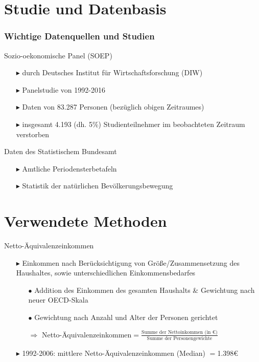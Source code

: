 \documentclass{beamer}
\begin{document}
\section{Studie und Datenbasis}
\begin{frame}
\frametitle{Wichtige Datenquellen und Studien}
  \begin{block}{Sozio-oekonomische Panel (SOEP)}
   \begin{itemize}
     \item [$\blacktriangleright$] durch Deutsches Institut für   Wirtschaftsforschung (DIW)
     \item [$\blacktriangleright$] Panelstudie von 1992-2016
     \item [$\blacktriangleright$] Daten von  83.287 Personen (bezüglich obigen Zeitraumes)
     \item[$\blacktriangleright$] insgesamt 4.193 (dh. 5\%) Studienteilnehmer im beobachteten Zeitraum verstorben
   \end{itemize}
  \end{block}
  \begin{block}{Daten des Statistischem Bundesamt}
   \begin{itemize}
     \item [$\blacktriangleright$] Amtliche Periodensterbetafeln
     \item [$\blacktriangleright$] Statistik der natürlichen Bevölkerungsbewegung
   \end{itemize}
  \end{block}
\end{frame}


\section{Verwendete Methoden}
\begin{frame}{Netto-Äquivalenzeinkommen}
	\begin{itemize}
		\item[$\blacktriangleright$] Einkommen nach Berücksichtigung von Größe/Zusammensetzung des Haushaltes, sowie unterschiedlichen Einkommensbedarfes
\vspace{0.3cm}		
		\begin{itemize}
		\item[$\bullet$]	Addition des Einkommen des gesamten Haushalts \& Gewichtung nach neuer OECD-Skala
		\item[$\bullet$] Gewichtung nach Anzahl und Alter der Personen gerichtet
\vspace{0.2cm}
		\item[$\Rightarrow$] Netto-Äquivalenzeinkommen$=\frac{\text{Summe der Nettoinkommen (in €)}}{\text{Summe der Personengewichte}}$
		\end{itemize}
\vspace{0.3cm}
		\item[$\blacktriangleright$] 1992-2006: mittlere Netto-Äquivalenzeinkommen (Median) $=$1.398€
	\end{itemize}
\end{frame}
\end{document}
